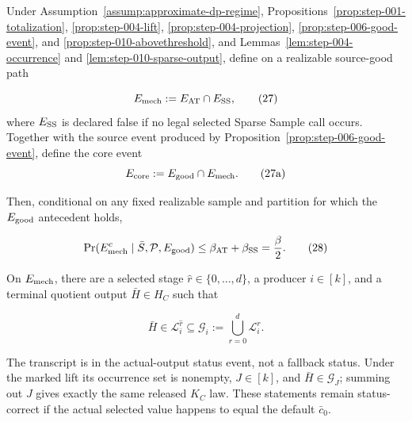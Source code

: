 \begin{proposition}\label{prop:step-010-mechanism-good}
Under Assumption~\ref{assump:approximate-dp-regime}, 
Propositions~\ref{prop:step-001-totalization},
\ref{prop:step-004-lift}, \ref{prop:step-004-projection},
\ref{prop:step-006-good-event}, and
\ref{prop:step-010-abovethreshold}, and
Lemmas~\ref{lem:step-004-occurrence} and
\ref{lem:step-010-sparse-output}, define on a realizable source-good path

\[
 E_{\rm mech}:=E_{\rm AT}\cap E_{\rm SS},
 \tag{27}
\]
where \(E_{\rm SS}\) is declared false if no legal selected Sparse Sample
call occurs. Together with the source event produced by
Proposition~\ref{prop:step-006-good-event}, define the core event
\[
E_{\rm core}:=E_{\rm good}\cap E_{\rm mech}.
\tag{27a}
\]

Then, conditional on any fixed realizable sample and partition for which the
\(E_{\rm good}\) antecedent holds,

\[
 \Pr(E_{\rm mech}^c\mid\bar S,\mathcal P,E_{\rm good})
 \leq\beta_{\rm AT}+\beta_{\rm SS}
 =\frac{\beta}{2}.
 \tag{28}
\]

On \(E_{\rm mech}\), there are a selected stage
\(\widehat r\in\{0,\ldots,d\}\), a producer \(i\in[k]\), and a terminal
quotient output \(\bar H\in H_C\) such that

\[
 \bar H\in\mathcal L_i^{\widehat r}
 \subseteq\mathcal G_i
 :=\bigcup_{r=0}^d\mathcal L_i^r.
 \tag{29}
\]

The transcript is in the actual-output status event, not a
fallback status. Under the marked lift its occurrence set is nonempty,
\(J\in[k]\), and \(\bar H\in\mathcal G_J\); summing out \(J\) gives exactly
the same released \(K_C\) law. These statements remain status-correct if
the actual selected value happens to equal the default \(\bar c_0\).


\end{proposition}

